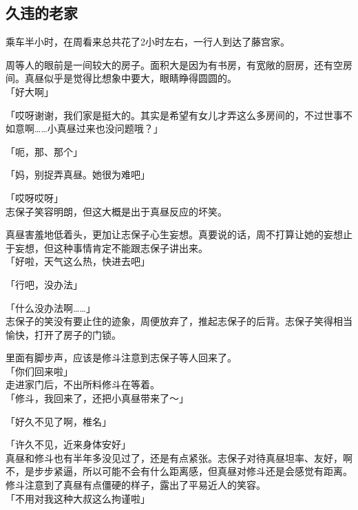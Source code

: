 \subsection{久违的老家}

乘车半小时，在周看来总共花了2小时左右，一行人到达了藤宫家。

周等人的眼前是一间较大的房子。面积大是因为有书房，有宽敞的厨房，还有空房间。真昼似乎是觉得比想象中要大，眼睛睁得圆圆的。\\

「好大啊」

「哎呀谢谢，我们家是挺大的。其实是希望有女儿才弄这么多房间的，不过世事不如意啊……小真昼过来也没问题哦？」

「呃，那、那个」

「妈，别捉弄真昼。她很为难吧」

「哎呀哎呀」\\

志保子笑容明朗，但这大概是出于真昼反应的坏笑。

真昼害羞地低着头，更加让志保子心生妄想。真要说的话，周不打算让她的妄想止于妄想，但这种事情肯定不能跟志保子讲出来。\\

「好啦，天气这么热，快进去吧」

「行吧，没办法」

「什么没办法啊……」\\

志保子的笑没有要止住的迹象，周便放弃了，推起志保子的后背。志保子笑得相当愉快，打开了房子的门锁。

里面有脚步声，应该是修斗注意到志保子等人回来了。\\

「你们回来啦」\\

走进家门后，不出所料修斗在等着。\\

「修斗，我回来了，还把小真昼带来了～」

「好久不见了啊，椎名」

「许久不见，近来身体安好」\\%

真昼和修斗也有半年多没见过了，还是有点紧张。志保子对待真昼坦率、友好，啊不，是步步紧逼，所以可能不会有什么距离感，但真昼对修斗还是会感觉有距离。\\

修斗注意到了真昼有点僵硬的样子，露出了平易近人的笑容。\\

「不用对我这种大叔这么拘谨啦」

